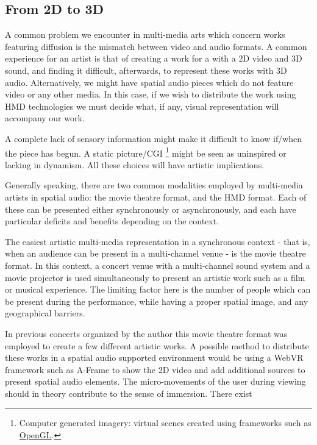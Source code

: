 \subsection{From 2D to 3D}

A common problem we encounter in multi-media arts which concern works featuring diffusion is the mismatch between video and audio formats. A common experience for an artist is that of creating a work for a with a 2D video and 3D sound, and finding it difficult, afterwards, to represent these works with 3D audio. Alternatively, we might have spatial audio pieces which do not feature video or any other media. In this case, if we wish to distribute the work using HMD technologies we must decide what, if any, visual representation will accompany our work. 

A complete lack of sensory information might make it difficult to know if/when the piece has begun. A static picture/CGI \footnote{Computer generated imagery: virtual scenes created using frameworks such as \href{https://www.opengl.org/}{OpenGL}.} might be seen as uninspired or lacking in dynamism. All these choices will have artistic implications. 

Generally speaking, there are two common modalities employed by multi-media artists in spatial audio: the movie theatre format, and the HMD format. Each of these can be presented either synchronously or asynchronously, and each have particular deficits and benefits depending on the context. 

The easiest artistic multi-media representation in a synchronous context - that is, when an audience can be present in a multi-channel venue - is the movie theatre format. In this context, a concert venue with a multi-channel sound system and a movie projector is used simultaneously to present an artistic work such as a film or musical experience. The limiting factor here is the number of people which can be present during the performance, while having a proper spatial image, and any geographical barriers. 

In previous concerts organized by the author this movie theatre format was employed to create a few different artistic works. A possible method to distribute these works in a spatial audio supported environment would be using a WebVR framework such as A-Frame to show the 2D video and add additional sources to present spatial audio elements. The micro-movements of the user during viewing should in theory contribute to the sense of immersion.  There exist  

